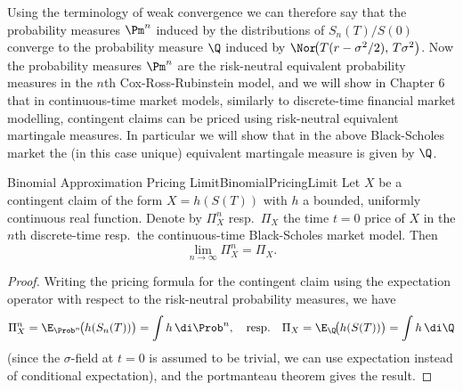 Using the terminology of weak convergence we can therefore say that the probability measures
\(\Pm^n\) induced by the distributions of \(S_n(T)/S(0)\) converge to the probability measure
\(\Q\) induced by \(\Nor\!\big(T(r-\sigma^2/2),\,T\sigma^2\big)\). Now the probability measures
\(\Pm^n\) are the risk-neutral equivalent probability measures in the \(n\)th Cox-Ross-Rubinstein
model, and we will show in Chapter 6 that in continuous-time market models, similarly to discrete-time
financial market modelling, contingent claims can be priced using risk-neutral equivalent martingale
measures. In particular we will show that in the above Black-Scholes market the (in this case unique)
equivalent martingale measure is given by \(\Q\).

\begin{prop}{Binomial Approximation Pricing Limit}{BinomialPricingLimit}
	Let \(X\) be a contingent claim of the form \(X = h(S(T))\) with \(h\) a bounded, uniformly continuous real function. Denote by \(\Pi_X^n\) resp.\ \(\Pi_X\) the time \(t = 0\) price of \(X\) in the \(n\)th discrete-time resp.\ the continuous-time Black-Scholes market model. Then
	\[
		\lim_{n\to\infty} \Pi_X^n = \Pi_X.
	\]
\end{prop}
\begin{proof}
	Writing the pricing formula for the contingent claim using the expectation operator with respect to the risk-neutral probability measures, we have
	\[
		\Pi_X^n = \E_{\Prob^n}\!\big(h(S_n(T))\big) = \int h \,\di \Prob^n,
		\quad \text{resp.} \quad
		\Pi_X = \E_{\Q}\!\big(h(S(T))\big) = \int h \,\di \Q
	\]
	(since the \(\sigma\)-field at \(t = 0\) is assumed to be trivial, we can use expectation instead of conditional expectation), and the portmanteau theorem gives the result.
\end{proof}
